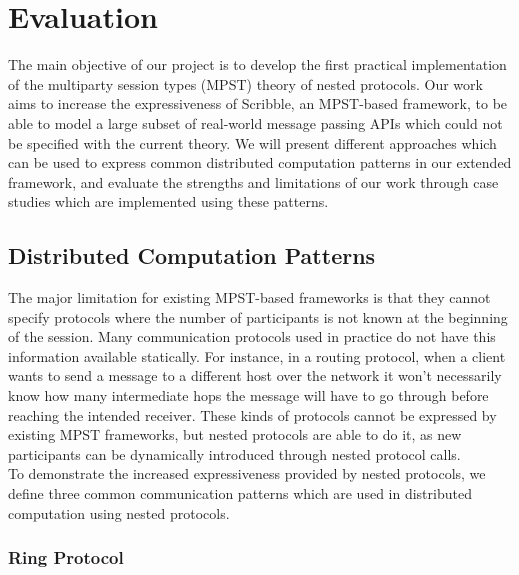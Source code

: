 \documentclass[12pt,twoside]{report}
\begin{document}


\chapter{Evaluation}\label{evaluation}
The main objective of our project is to develop the first practical implementation of the multiparty session types (MPST) theory of nested protocols. Our work aims to increase the expressiveness of Scribble, an MPST-based framework, to be able to model a large subset of real-world message passing APIs which could not be specified with the current theory. We will present different approaches which can be used to express common distributed computation patterns in our extended framework, and evaluate the strengths and limitations of our work through case studies which are implemented using these patterns.

\section{Distributed Computation Patterns}
The major limitation for existing MPST-based frameworks is that they cannot specify protocols where the number of participants is not known at the beginning of the session\cite{parametrictypes}. Many communication protocols used in practice do not have this information available statically. For instance, in a routing protocol, when a client wants to send a message to a different host over the network it won't necessarily know how many intermediate hops the message will have to go through before reaching the intended receiver. These kinds of protocols cannot be expressed by existing MPST frameworks, but nested protocols are able to do it, as new participants can be dynamically introduced through nested protocol calls.\\

To demonstrate the increased expressiveness provided by nested protocols, we define three common communication patterns which are used in distributed computation using nested protocols.

\subsection{Ring Protocol}\label{ring}
\end{document}

